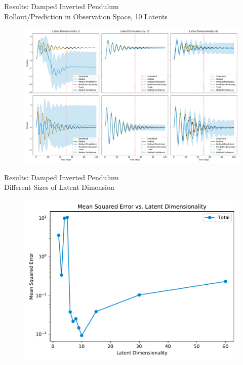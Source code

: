 \documentclass[
	aspectratio=43,
	color={accentcolor=1c},
	logo=false,
	colorframetitle=true
]{tudabeamer}
\begin{document}
			\begin{frame}{Results: Damped Inverted Pendulum \\ Rollout/Prediction in Observation Space, 10 Latents}
				\vspace{-0.4cm}
				\begin{figure}
					\centering
					\includegraphics[height = 0.8\textheight]{figures/results/latent-dimensions-experiment_rollout}
				\end{figure}
			\end{frame}

			\begin{frame}{Results: Damped Inverted Pendulum \\ Different Sizes of Latent Dimension}
				\vspace{-0.4cm}
				\begin{figure}
					\centering
					\includegraphics[height = 0.8\textheight]{figures/results/latent-dimensions-experiment_mse}
				\end{figure}
			\end{frame}
\end{document}
